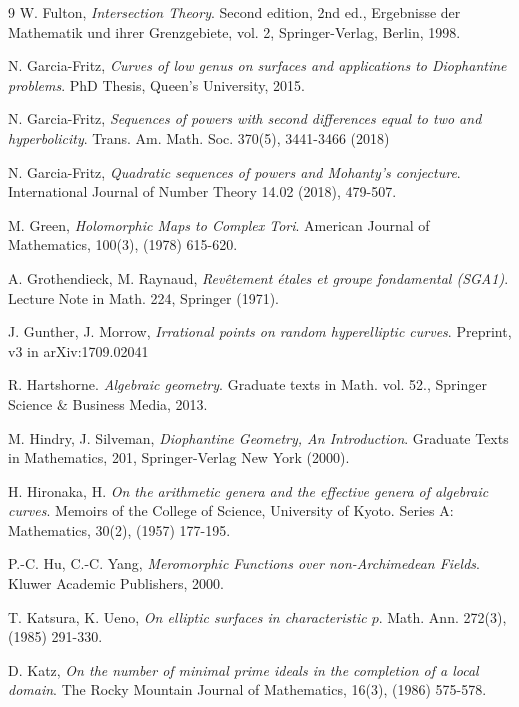 \documentclass[11pt]{amsart}
\theoremstyle{remark}
\numberwithin{equation}{section}
\begin{document}
\begin{thebibliography}{9}
 W. Fulton, \emph{Intersection Theory}. Second edition, 2nd ed., Ergebnisse der Mathematik und ihrer Grenzgebiete, vol. 2, Springer-Verlag, Berlin, 1998.



 N. Garcia-Fritz,  \emph{Curves of low genus on surfaces and applications to Diophantine problems}. PhD Thesis, Queen's University, 2015.

 N. Garcia-Fritz, \emph{Sequences of powers with second differences equal to two and hyperbolicity}. Trans. Am. Math. Soc. 370(5), 3441-3466 (2018)

 N. Garcia-Fritz, \emph{Quadratic sequences of powers and Mohanty's conjecture}. International Journal of Number Theory 14.02 (2018), 479-507.


 M. Green, \emph{Holomorphic Maps to Complex Tori}. American Journal of Mathematics, 100(3), (1978) 615-620.

 A. Grothendieck, M. Raynaud,  \emph{Rev\^etement \'etales et groupe fondamental (SGA1)}. Lecture Note in Math. 224, Springer (1971).



 J. Gunther, J. Morrow, \emph{Irrational points on random hyperelliptic curves}. Preprint, v3 in arXiv:1709.02041

 R. Hartshorne. \emph{Algebraic  geometry}. Graduate texts in Math. vol. 52.,  Springer Science \& Business Media, 2013.



 M. Hindry, J. Silveman, \emph{Diophantine Geometry, An Introduction}. Graduate Texts in Mathematics, 201, Springer-Verlag New York (2000).

 H. Hironaka, H. \emph{On the arithmetic genera and the effective genera of algebraic curves}. Memoirs of the College of Science, University of Kyoto. Series A: Mathematics, 30(2), (1957) 177-195.

 P.-C. Hu, C.-C. Yang, \emph{Meromorphic Functions over non-Archimedean Fields}. Kluwer Academic Publishers, 2000.

 T. Katsura, K. Ueno, \emph{On elliptic surfaces in characteristic $p$}. Math. Ann. 272(3), (1985) 291-330.

 D. Katz, \emph{On the number of minimal prime ideals in the completion of a local domain}. The Rocky Mountain Journal of Mathematics, 16(3), (1986) 575-578.


\end{thebibliography}
\end{document}
